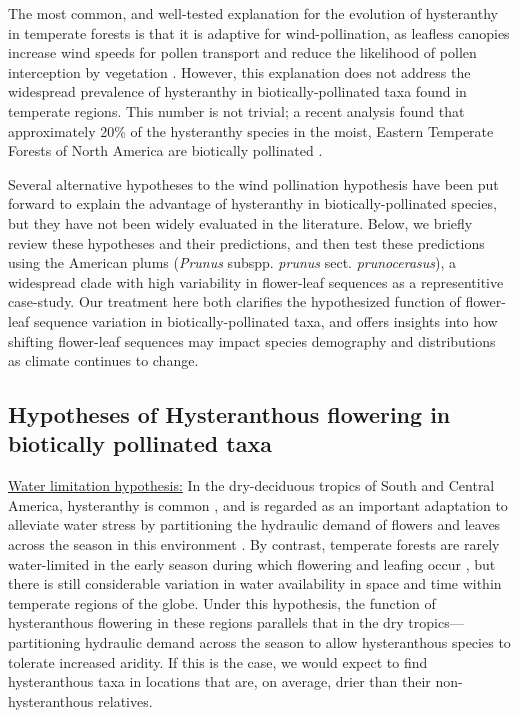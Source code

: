 \documentclass{article}[11pt]
\begin{document}
\noindent The most common, and well-tested explanation for the evolution of hysteranthy in temperate forests is that it is adaptive for wind-pollination, as leafless canopies increase wind speeds for pollen transport and reduce the likelihood of pollen interception by vegetation \citep{Whitehead1969,Niklas1985}. However, this explanation does not address the widespread prevalence of hysteranthy in biotically-pollinated taxa found in temperate regions. This number is not trivial; a recent analysis found that approximately 20\% of the hysteranthy species in the moist, Eastern Temperate Forests of North America are biotically pollinated \citep{Buonaiuto2020}. 

Several alternative hypotheses to the wind pollination hypothesis have been put forward to explain the advantage of hysteranthy in biotically-pollinated species, but they have not been widely evaluated in the literature. Below, we briefly review these hypotheses and their predictions, and then test these predictions using the American plums (\textit{Prunus} subspp. \textit{prunus} sect. \textit{prunocerasus}), a widespread clade with high variability in flower-leaf sequences as a representitive case-study. Our treatment here both clarifies the hypothesized function of flower-leaf sequence variation in biotically-pollinated taxa, and offers insights into how shifting flower-leaf sequences may impact species demography and distributions as climate continues to change.

\subsection*{Hypotheses of Hysteranthous flowering in biotically pollinated taxa}

\underline{Water limitation hypothesis:} In the dry-deciduous tropics of South and Central America, hysteranthy is common \citep{Rathcke_1985,Franklin2016}, and is regarded as an important adaptation to alleviate water stress by partitioning the hydraulic demand of flowers and leaves across the season in this environment \citep{Gougherty2018,Franklin2016,Borchert1983,Reich1984}. By contrast,
temperate forests are rarely water-limited in the early season during which flowering and leafing occur \citep{Polgar2011}, but there is still considerable variation in water availability in space and time within temperate regions of the globe. Under this hypothesis, the function of hysteranthous flowering in these regions parallels that in the dry tropics---partitioning hydraulic demand across the season to allow hysteranthous species to tolerate increased aridity. If this is the case, we would expect to find hysteranthous taxa in locations that are, on average, drier than their non-hysteranthous relatives.
\end{document}
